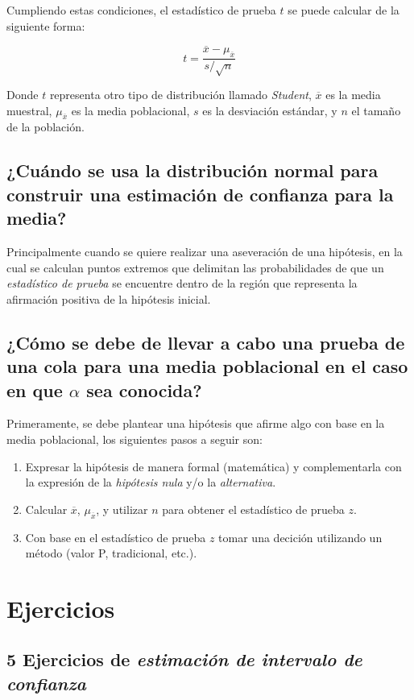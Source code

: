 \documentclass[a4paper, 12pt]{article}
\begin{document}
Cumpliendo estas condiciones, el estadístico de prueba $t$ se puede calcular de la siguiente forma:

\begin{equation}
    t=\frac{\overline{x}-\mu_{\overline{x}}}{s/\sqrt{n}}
\end{equation}

Donde $t$ representa otro tipo de distribución llamado \emph{Student}, $\overline{x}$ es la media muestral, $\mu_{\overline{x}}$ es la media poblacional, $s$ es la desviación estándar, y $n$ el tamaño de la población.

\subsection{¿Cuándo se usa la distribución normal para construir una estimación de confianza para la media?}
Principalmente cuando se quiere realizar una aseveración de una hipótesis, en la cual se calculan puntos extremos que delimitan las probabilidades de que un \emph{estadístico de prueba} se encuentre dentro de la región que representa la afirmación positiva de la hipótesis inicial.

\subsection{¿Cómo se debe de llevar a cabo una prueba de una cola para una media poblacional en el caso en que $\alpha$ sea conocida?}
Primeramente, se debe plantear una hipótesis que afirme algo con base en la media poblacional, los siguientes pasos a seguir son:

\begin{enumerate}
    \item Expresar la hipótesis de manera formal (matemática) y complementarla con la expresión de la \emph{hipótesis nula} y/o la \emph{alternativa}.
    \item Calcular $\overline{x}$, $\mu_{\overline{x}}$, y utilizar $n$ para obtener el estadístico de prueba $z$.
    \item Con base en el estadístico de prueba $z$ tomar una decición utilizando un método (valor P, tradicional, etc.).
\end{enumerate}

\section{Ejercicios}
\subsection{5 Ejercicios de \emph{estimación de intervalo de confianza}}
\end{document}
